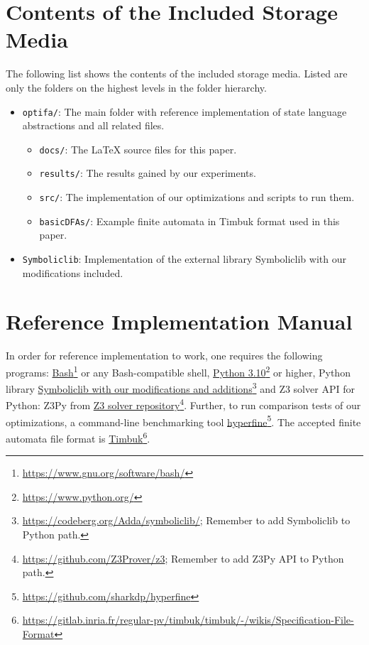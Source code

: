 
\chapter{Contents of the Included Storage Media}

The following list shows the contents of the included storage media. Listed are only the folders on the highest levels in the folder hierarchy.

\begin{itemize}
    \item \texttt{optifa/}: The main folder with reference implementation of state language abstractions and all related files.
    \begin{itemize}
        \item \texttt{docs/}: The LaTeX source files for this paper.
        \item \texttt{results/}: The results gained by our experiments.
        \item \texttt{src/}: The implementation of our optimizations and scripts to run them.
        \item \texttt{basicDFAs/}: Example finite automata in Timbuk format used in this paper.
    \end{itemize}

    \item \texttt{Symboliclib}: Implementation of the external library Symboliclib with our modifications included.

\end{itemize}


\chapter{Reference Implementation Manual}

In order for reference implementation to work, one requires the following programs: \href{https://www.gnu.org/software/bash/}{Bash}\footnote{\url{https://www.gnu.org/software/bash/}} or any Bash-compatible shell, \href{https://www.python.org/}{Python 3.10}\footnote{\url{https://www.python.org/}} or higher, Python library \href{https://codeberg.org/Adda/symboliclib/}{Symboliclib with our modifications and additions}\footnote{\url{https://codeberg.org/Adda/symboliclib/}; Remember to add Symboliclib to Python path.} and Z3 solver API for Python: Z3Py from \href{https://github.com/Z3Prover/z3}{Z3 solver repository}\footnote{\url{https://github.com/Z3Prover/z3}; Remember to add Z3Py API to Python path.}. Further, to run comparison tests of our optimizations, a command-line benchmarking tool \href{https://github.com/sharkdp/hyperfine}{hyperfine}\footnote{\url{https://github.com/sharkdp/hyperfine}}. The accepted finite automata file format is \href{https://gitlab.inria.fr/regular-pv/timbuk/timbuk/-/wikis/Specification-File-Format}{Timbuk}\footnote{\url{https://gitlab.inria.fr/regular-pv/timbuk/timbuk/-/wikis/Specification-File-Format}}.

